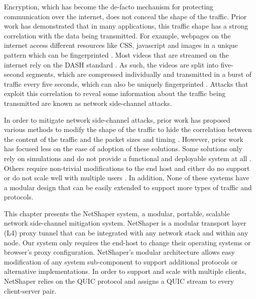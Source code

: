 
Encryption, which has become the de-facto mechanism for protecting communication over the internet, does not conceal the shape of the traffic.
Prior work has demonstrated that in many applications, this traffic shape has a strong correlation with the data being transmitted.
For example, webpages on the internet access different resources like CSS, javascript and images in a unique pattern which can be fingerprinted \cite{gong2010fingerprinting, bhat2019varcnn, wang2014supersequence}.
Most videos that are streamed on the internet rely on the DASH standard \cite{dash2013}.
As such, the videos are split into five-second segments, which are compressed individually and transmitted in a burst of traffic every five seconds, which can also be uniquely fingerprinted \cite{schuster2017beautyburst}.
Attacks that exploit this correlation to reveal some information about the traffic being transmitted are known as network side-channel attacks.


In order to mitigate network side-channel attacks, prior work has proposed various methods to modify the shape of the traffic to hide the correlation between the content of the traffic and the packet sizes and timing \cite{hou2020wf, nasr2021blind, rahman2020mockingbird, shan2021dolos, wang2017walkie, wright2009traffic, mehta2022pacer, zhang2019statistical, cai2014csbuflo}.
However, prior work has focused less on the ease of adoption of these solutions. 
Some solutions only rely on simulations and do not provide a functional and deployable system at all \cite{wang2014supersequence, nithyanand2014glove, cai2014tamaraw}. 
Others require non-trivial modifications to the end host and either do no support or do not scale well with multiple users \cite{cai2014csbuflo, mehta2022pacer}.
In addition, None of these systems have a modular design that can be easily extended to support more types of traffic and protocols.

This chapter presents the NetShaper system, a modular, portable, scalable network side-channel mitigation system.
NetShaper is a modular transport layer (L4) proxy tunnel that can be integrated with any network stack and within any node.
Our system only requires the end-host to change their operating systems or browser's proxy configuration.
NetShaper's modular architecture allows easy modification of any system sub-component to support additional protocols or alternative implementations.
In order to support and scale with multiple clients, NetShaper relies on the QUIC protocol and assigns a QUIC stream to every client-server pair.

